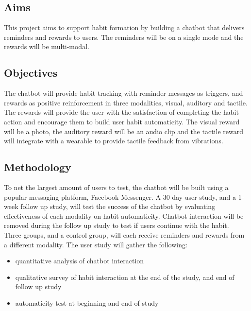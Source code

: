 \subsection*{Aims}
This project aims to support habit formation by building a chatbot that delivers reminders and rewards to users. The reminders will be on a single mode and the rewards will be multi-modal.

\subsection*{Objectives}
The chatbot will provide habit tracking with reminder messages as triggers, and rewards as positive reinforcement in three modalities, visual, auditory and tactile.\newline
\newline
The rewards will provide the user with the satisfaction of completing the habit action and encourage them to build user habit automaticity. The visual reward will be a photo, the auditory reward will be an audio clip and the tactile reward will integrate with a wearable to provide tactile feedback from vibrations.

\subsection*{Methodology}
To net the largest amount of users to test, the chatbot will be built using a popular messaging platform, Facebook Messenger.\newline
\newline
A 30 day user study, and a 1-week follow up study, will test the success of the chatbot by evaluating effectiveness of each modality on habit automaticity. Chatbot interaction will be removed during the follow up study to test if users continue with the habit. Three groups, and a control group, will each receive reminders and rewards from a different modality.\newline
\newline
The user study will gather the following:
\begin{itemize}
  \item quantitative analysis of chatbot interaction
  \item qualitative survey of habit interaction at the end of the study, and end of follow up study
  \item automaticity test at beginning and end of study
\end{itemize}


